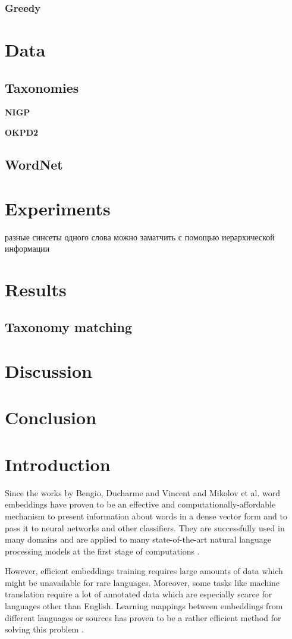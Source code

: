 \documentclass[11pt,a4paper]{article}
\begin{document}
\subsubsection{Greedy}
\section{Data}
\subsection{Taxonomies}
\textbf{NIGP}

\textbf{OKPD2}
\subsection{WordNet}
\section{Experiments}
\foreignlanguage{russian}{разные синсеты одного слова можно заматчить с помощью иерархической информации}
\section{Results}
\subsection{Taxonomy matching}
\section{Discussion}
\section{Conclusion}


\section{Introduction}
Since the works by Bengio, Ducharme and Vincent \cite{bengio} and Mikolov et al. \cite{mikolov-representations-2013} word embeddings have proven to be an effective and computationally-affordable mechanism to present information about words in a dense vector form and to pass it to neural networks and other classifiers. They are successfully used in many domains and are applied to many state-of-the-art natural language processing models at the first stage of computations \cite{levy-goldberg-2015}.

However, efficient embeddings training requires large amounts of data which might be unavailable for rare languages. Moreover, some tasks like machine translation require a lot of annotated data which are especially scarce for languages other than English. Learning mappings between embeddings from different languages or sources has proven to be a rather efficient method for solving this problem \cite{ruder-survey}.
\end{document}
